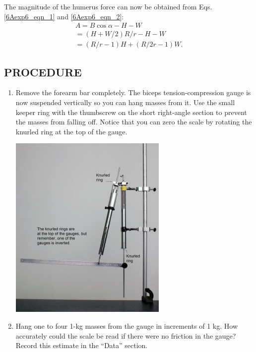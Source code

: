 The magnitude of the humerus force can now be obtained from Eqs. \ref{6Aexp6_eqn_1} and \ref{6Aexp6_eqn_2}:
\begin{align} A = B\cos\alpha - H - W  \\
                      = (H + W/2) R/r - H - W  \\
                      = (R/r-1)H + (R/2r-1)W.  \label{6Aexp6_eqn_4} \end{align}

\subsection*{PROCEDURE}

\begin{enumerate}[label=\arabic*.]

\item Remove the forearm bar completely.  The biceps tension-compression gauge is now suspended vertically so you can hang masses from it.  Use the small keeper ring with the thumbscrew on the short right-angle section to prevent the masses from falling off.  Notice that you can zero the scale by rotating the knurled ring at the top of the gauge.
\begin{center} \includegraphics*[width=0.6\textwidth]{imgs/6labs/6Alab/6Aexp6/6A-EXP6_knurled_ring_web_1.jpg} \end{center}

\item Hang one to four 1-kg masses from the gauge in increments of 1 kg.  How accurately could the scale be read if there were no friction in the gauge?  Record this estimate in the ``Data'' section.


\end{enumerate}
